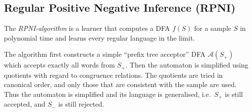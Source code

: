 \documentclass[english]{panikzettel}
\newcommand{\A}{\mathcal{A}}
\begin{document}
\newpage
\subsection{Regular Positive Negative Inference (RPNI)}

The \emph{RPNI-algorithm} is a learner that computes a DFA $f(S)$ for a sample $S$ in polynomial time and learns every regular language in the limit.

The algorithm first constructs a simple ``prefix tree acceptor'' DFA $\A(S_+)$ which accepts exactly all words from $S_+$.
Then the automaton is simplified using quotients with regard to congruence relations.
The quotients are tried in canonical order, and only those that are consistent with the sample are used.
Thus the automaton is simplified and its language is generalised, i.e.\ $S_+$ is still accepted, and $S_-$ is still rejected.
\end{document}
